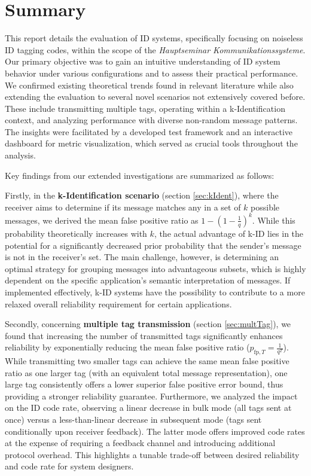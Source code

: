 \documentclass[english,BCOR=4mm,cdfont=false]{tudscrreprt} %
\begin{document}
\section{Summary}
\label{sec:summary}
This report details the evaluation of ID systems, specifically focusing on noiseless ID tagging codes, within the scope of the \textit{Hauptseminar Kommunikationssysteme}. Our primary objective was to gain an intuitive understanding of ID system behavior under various configurations and to assess their practical performance. We confirmed existing theoretical trends found in relevant literature \cite{ID_Codes_Topical_Review} while also extending the evaluation to several novel scenarios not extensively covered before. These include transmitting multiple tags, operating within a k-Identification context, and analyzing performance with diverse non-random message patterns. The insights were facilitated by a developed test framework and an interactive dashboard for metric visualization, which served as crucial tools throughout the analysis.

Key findings from our extended investigations are summarized as follows:

Firstly, in the \textbf{k-Identification scenario} (section \ref{sec:kIdent}), where the receiver aims to determine if its message matches any in a set of $k$ possible messages, we derived the mean false positive ratio as $1-(1-\frac{1}{q})^k$. While this probability theoretically increases with $k$, the actual advantage of k-ID lies in the potential for a significantly decreased prior probability that the sender's message is not in the receiver's set. The main challenge, however, is determining an optimal strategy for grouping messages into advantageous subsets, which is highly dependent on the specific application's semantic interpretation of messages. If implemented effectively, k-ID systems have the possibility to contribute to a more relaxed overall reliability requirement for certain applications.

Secondly, concerning \textbf{multiple tag transmission} (section \ref{sec:multTag}), we found that increasing the number of transmitted tags significantly enhances reliability by exponentially reducing the mean false positive ratio ($p_{\text{fp},T} = \frac{1}{q^T}$). While transmitting two smaller tags can achieve the same mean false positive ratio as one larger tag (with an equivalent total message representation), one large tag consistently offers a lower superior false positive error bound, thus providing a stronger reliability guarantee. Furthermore, we analyzed the impact on the ID code rate, observing a linear decrease in bulk mode (all tags sent at once) versus a less-than-linear decrease in subsequent mode (tags sent conditionally upon receiver feedback). The latter mode offers improved code rates at the expense of requiring a feedback channel and introducing additional protocol overhead. This highlights a tunable trade-off between desired reliability and code rate for system designers. 
\end{document}
